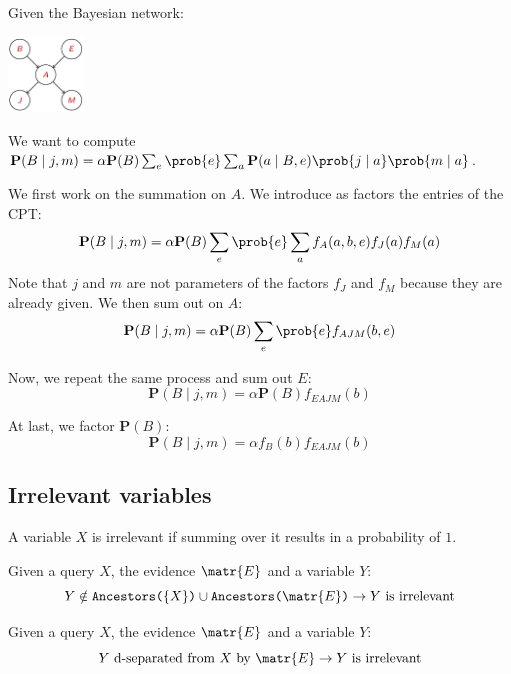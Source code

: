 \begin{example}[Burglary]
    Given the Bayesian network:
    \begin{center}
        \includegraphics[width=0.15\textwidth]{img/_burglary_net.pdf}
    \end{center}
    We want to compute 
    $\textbf{P}(B \mid j, m) = \alpha \textbf{P}(B) \sum_{e} \prob{e} \sum_{a} \textbf{P}(a \mid B, e) \prob{j \mid a} \prob{m \mid a}$.
    
    We first work on the summation on $A$.
    We introduce as factors the entries of the CPT:
        \[ \textbf{P}(B \mid j, m) = \alpha \textbf{P}(B) \sum_{e} \prob{e} \sum_{a} f_A(a, b, e) f_J(a) f_M(a) \]
    Note that $j$ and $m$ are not parameters of the factors $f_J$ and $f_M$ because they are already given.
    We then sum out on $A$:
        \[ \textbf{P}(B \mid j, m) = \alpha \textbf{P}(B) \sum_{e} \prob{e} f_{AJM}(b, e) \]

    Now, we repeat the same process and sum out $E$:
        \[ \textbf{P}(B \mid j, m) = \alpha \textbf{P}(B) f_{EAJM}(b) \]

    At last, we factor $\textbf{P}(B)$:
        \[ \textbf{P}(B \mid j, m) = \alpha f_B(b) f_{EAJM}(b) \]
\end{example}


\subsection{Irrelevant variables}
A variable $X$ is irrelevant if summing over it results in a probability of $1$.

\begin{theorem}
    Given a query $X$, the evidence $\matr{E}$ and a variable $Y$:
        \[ Y \notin \texttt{Ancestors($\{ X \}$)} \cup  \texttt{Ancestors($\matr{E}$)} \rightarrow Y \text{ is irrelevant} \]
\end{theorem}

\begin{theorem}
    Given a query $X$, the evidence $\matr{E}$ and a variable $Y$:
    \[ Y \text{ d-separated from } X \text{ by } \matr{E} \rightarrow Y \text{ is irrelevant} \]
\end{theorem}


